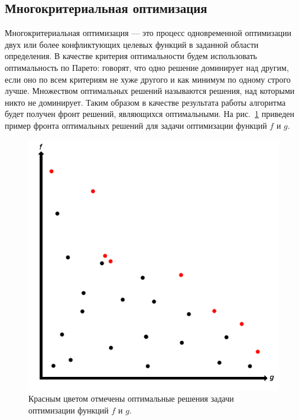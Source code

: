 \documentclass[12pt,fleqn]{article}
\begin{document}
\FloatBarrier

\subsection{Многокритериальная оптимизация}

Многокритериальная оптимизация --- это процесс одновременной оптимизации двух или более конфликтующих целевых функций
в заданной области определения. В качестве критерия оптимальности будем использовать оптимальность по Парето:
говорят, что одно решение доминирует над другим, если оно по всем критериям не хуже другого и как минимум по одному
строго лучше. Множеством оптимальных решений называются решения, над которыми никто не доминирует. Таким образом
в качестве результата работы алгоритма будет получен фронт решений, являющихся оптимальными. На рис.~\ref{opt}
приведен пример фронта оптимальных решений для задачи оптимизации функций $f$ и $g$.

\FloatBarrier

\begin{figure}[!h]
  \centering
    \includegraphics[scale=0.3]{opt.png}
  \caption{Красным цветом отмечены оптимальные решения задачи оптимизации функций $f$ и $g$.}
  \label{opt}
\end{figure}

\FloatBarrier
\end{document}
